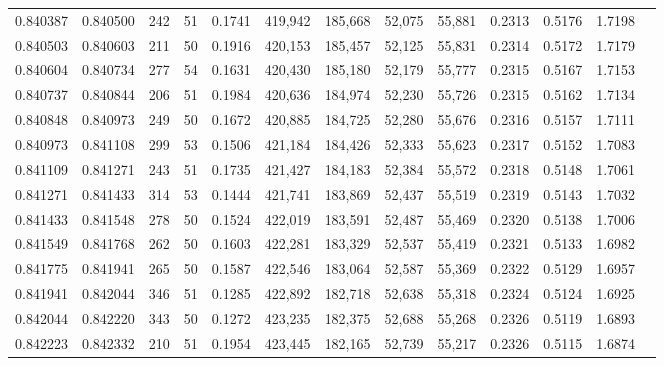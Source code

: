 \begin{tabular}{rrrrrrrrrrrrr}
0.840387 & 0.840500 &   242 &  51 &                                     0.1741 & 419,942 & 185,668 &  52,075 &  55,881 & 0.2313 & 0.5176 & 1.7198 \\
0.840503 & 0.840603 &   211 &  50 &                                     0.1916 & 420,153 & 185,457 &  52,125 &  55,831 & 0.2314 & 0.5172 & 1.7179 \\
0.840604 & 0.840734 &   277 &  54 &                                     0.1631 & 420,430 & 185,180 &  52,179 &  55,777 & 0.2315 & 0.5167 & 1.7153 \\
0.840737 & 0.840844 &   206 &  51 &                                     0.1984 & 420,636 & 184,974 &  52,230 &  55,726 & 0.2315 & 0.5162 & 1.7134 \\
0.840848 & 0.840973 &   249 &  50 &                                     0.1672 & 420,885 & 184,725 &  52,280 &  55,676 & 0.2316 & 0.5157 & 1.7111 \\
0.840973 & 0.841108 &   299 &  53 &                                     0.1506 & 421,184 & 184,426 &  52,333 &  55,623 & 0.2317 & 0.5152 & 1.7083 \\
0.841109 & 0.841271 &   243 &  51 &                                     0.1735 & 421,427 & 184,183 &  52,384 &  55,572 & 0.2318 & 0.5148 & 1.7061 \\
0.841271 & 0.841433 &   314 &  53 &                                     0.1444 & 421,741 & 183,869 &  52,437 &  55,519 & 0.2319 & 0.5143 & 1.7032 \\
0.841433 & 0.841548 &   278 &  50 &                                     0.1524 & 422,019 & 183,591 &  52,487 &  55,469 & 0.2320 & 0.5138 & 1.7006 \\
0.841549 & 0.841768 &   262 &  50 &                                     0.1603 & 422,281 & 183,329 &  52,537 &  55,419 & 0.2321 & 0.5133 & 1.6982 \\
0.841775 & 0.841941 &   265 &  50 &                                     0.1587 & 422,546 & 183,064 &  52,587 &  55,369 & 0.2322 & 0.5129 & 1.6957 \\
0.841941 & 0.842044 &   346 &  51 &                                     0.1285 & 422,892 & 182,718 &  52,638 &  55,318 & 0.2324 & 0.5124 & 1.6925 \\
0.842044 & 0.842220 &   343 &  50 &                                     0.1272 & 423,235 & 182,375 &  52,688 &  55,268 & 0.2326 & 0.5119 & 1.6893 \\
0.842223 & 0.842332 &   210 &  51 &                                     0.1954 & 423,445 & 182,165 &  52,739 &  55,217 & 0.2326 & 0.5115 & 1.6874 \\

\end{tabular}

